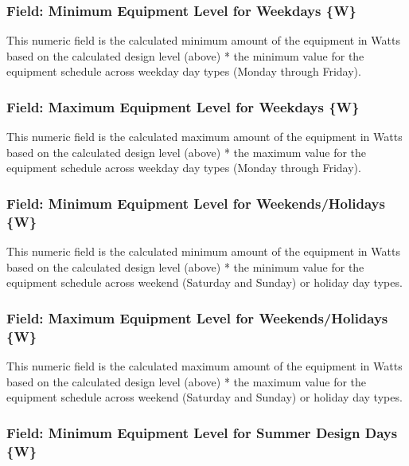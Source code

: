 \subsubsection{Field: Minimum Equipment Level for Weekdays \{W\}}\label{field-minimum-equipment-level-for-weekdays-w}

This numeric field is the calculated minimum amount of the equipment in Watts based on the calculated design level (above) * the minimum value for the equipment schedule across weekday day types (Monday through Friday).

\subsubsection{Field: Maximum Equipment Level for Weekdays \{W\}}\label{field-maximum-equipment-level-for-weekdays-w}

This numeric field is the calculated maximum amount of the equipment in Watts based on the calculated design level (above) * the maximum value for the equipment schedule across weekday day types (Monday through Friday).

\subsubsection{Field: Minimum Equipment Level for Weekends/Holidays \{W\}}\label{field-minimum-equipment-level-for-weekends-holidays-w}

This numeric field is the calculated minimum amount of the equipment in Watts based on the calculated design level (above) * the minimum value for the equipment schedule across weekend (Saturday and Sunday) or holiday day types.

\subsubsection{Field: Maximum Equipment Level for Weekends/Holidays \{W\}}\label{field-maximum-equipment-level-for-weekends-holidays-w}

This numeric field is the calculated maximum amount of the equipment in Watts based on the calculated design level (above) * the maximum value for the equipment schedule across weekend (Saturday and Sunday) or holiday day types.

\subsubsection{Field: Minimum Equipment Level for Summer Design Days \{W\}}\label{field-minimum-equipment-level-for-summer-designdays-w}

